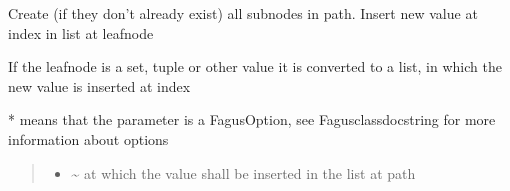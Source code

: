 \documentclass[a4paper,10pt,english]{sphinxmanual}
\begin{document}
\begin{fulllineitems}
\begin{fulllineitems}
\label{\detokenize{fagus:fagus.Fagus.insert}}
\pysigstartsignatures
{}
\pysigstopsignatures
\sphinxAtStartPar
Create (if they don’t already exist) all sub\sphinxhyphen{}nodes in path. Insert new value at index in list at leaf\sphinxhyphen{}node

\sphinxAtStartPar
If the leaf\sphinxhyphen{}node is a set, tuple or other value it is converted to a list, in which the new value is inserted at
index

\sphinxAtStartPar
* means that the parameter is a FagusOption, see Fagus\sphinxhyphen{}class\sphinxhyphen{}docstring for more information about options
\begin{quote}\begin{description}
\begin{itemize}
\item {}
\sphinxAtStartPar
{} \textendash{} \textasciitilde{} at which the value shall be inserted in the list at path


\end{itemize}
\end{description}
\end{quote}
\end{fulllineitems}
\end{fulllineitems}
\end{document}
